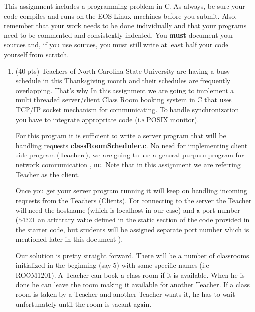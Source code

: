 \documentclass{article}
\begin{document}
\noindent
{}

\vspace{0.1in}

 This assignment includes a programming problem in C.  As always, be sure your code compiles and runs on the EOS Linux machines before you submit.  Also, remember that your work needs to be done individually and that your programs need to be commented and consistently indented.  You \textbf{must} document your sources and, if you use sources, you must still write at least half your code yourself from scratch.

\begin{enumerate}

\item(40 pts) Teachers of North Carolina State University are having a busy schedule in this Thanksgiving month and their schedules are frequently overlapping. That's why In this assignment we are going to implement a multi threaded server/client Class Room booking system in C that uses TCP/IP socket mechanism for communicating. To handle synchronization you have to integrate appropriate code (i.e POSIX monitor).

For this program it is sufficient to write a server program that will be handling requests \textbf{classRoomScheduler.c}. No need for implementing client side program (Teachers), we are going to use a general purpose program for network communication , \texttt{nc}. Note that in this assignment we are referring Teacher as the client.

Once you get your server program running it will keep on handling incoming requests from the Teachers (Clients). For connecting to the server the Teacher will need the hostname (which is localhost in our case) and a port number (54321 an arbitrary value defined in the static section of the code provided in the starter code, but students will be assigned separate port number which is mentioned later in this document ).

Our solution is pretty straight forward. There will be a number of classrooms initialized in the beginning (say 5) with some specific names (i.e ROOM1201). A Teacher can book a class room if it is available. When he is done he can leave the room making it available for another Teacher. If a class room is taken by a Teacher and another Teacher wants it, he has to wait unfortunately until the room is vacant again.


\end{enumerate}
\end{document}
